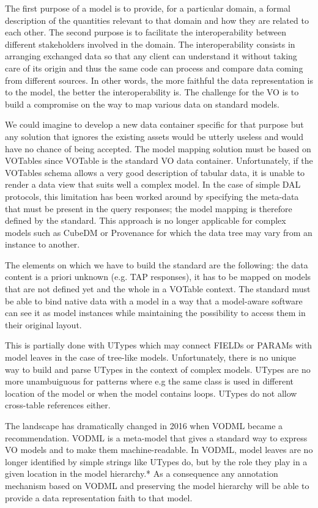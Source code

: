 
The first purpose of a model is to provide, for a particular domain, a formal description of the quantities relevant to that domain and how they are related to each other.
The second purpose is to facilitate the interoperability between  different stakeholders involved in the domain. The interoperability consists in arranging exchanged data 
so that any client can understand it without taking care of its origin and thus the same code can process and compare data coming from different sources.  
In other words, the more faithful the data representation is to the model, the better the interoperability is.
The challenge for the VO is to build a compromise on the way to map various data on standard models.

We could imagine to develop a new data container specific for that  purpose but any solution that ignores the existing assets would be utterly useless and would have no chance of being accepted.
The model mapping solution must be based on VOTables since VOTable  \citep{2019ivoa.spec.1021O} is the standard VO data container.
Unfortunately, if the VOTables schema allows a very good description of tabular data, it is unable to render a data view that suits well a complex model.
In the case of simple DAL protocols, this limitation has been worked around by specifying the meta-data that must be present in the query responses; the model mapping is therefore defined by the standard.
This approach is no longer applicable for complex models such as CubeDM or Provenance for which the data tree may vary from an instance to another.

The elements on which we have to build the standard are the following: the data content is a priori unknown (e.g. TAP responses), it has to be mapped on models that are not defined yet and the whole in a VOTable context.
The standard must be able to bind native data with a model in a way that a model-aware software can see it as 
model instances while maintaining the possibility to access them in their original layout.

This is partially done with UTypes which may connect FIELDs or PARAMs with model leaves in the case of tree-like models. 
Unfortunately, there is no unique  way to build and parse UTypes in the context of complex models. 
UTypes are no more unambuiguous for patterns where e.g the same class is used in different location of the model or when the model contains loops. 
UTypes do not allow cross-table references either. 

The landscape has dramatically changed in 2016 when VODML \citep{2018ivoa.spec.0910L} became a recommendation. 
VODML is a meta-model that gives a standard way to express VO models and to make them machine-readable.
In VODML, model leaves are no longer identified by simple strings like UTypes do, but by the role they play in a given location in the model hierarchy.*
As a consequence any annotation mechanism based on VODML and preserving the model hierarchy will be able  to provide a data representation faith to that model.

